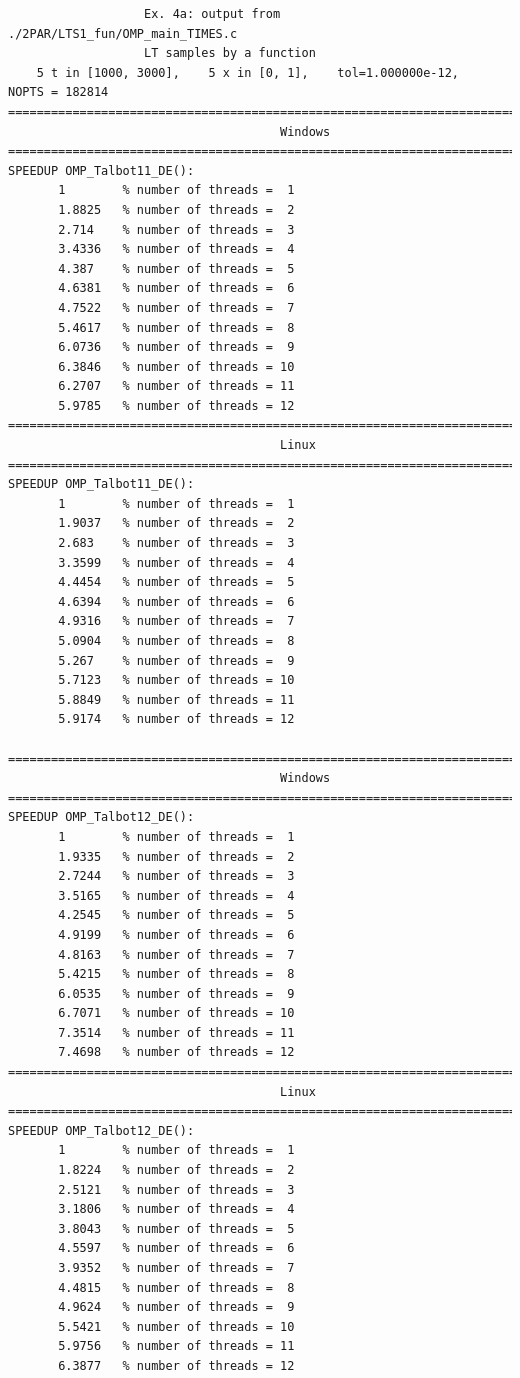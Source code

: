 \documentclass[a4paper,10pt]{report}%
\begin{document}
\begin{lstlisting}
                   Ex. 4a: output from ./2PAR/LTS1_fun/OMP_main_TIMES.c
                   LT samples by a function
    5 t in [1000, 3000],    5 x in [0, 1],    tol=1.000000e-12,    NOPTS = 182814
====================================================================================
                                      Windows
====================================================================================
SPEEDUP OMP_Talbot11_DE():
       1        % number of threads =  1
       1.8825   % number of threads =  2
       2.714    % number of threads =  3
       3.4336   % number of threads =  4
       4.387    % number of threads =  5
       4.6381   % number of threads =  6
       4.7522   % number of threads =  7
       5.4617   % number of threads =  8
       6.0736   % number of threads =  9
       6.3846   % number of threads = 10
       6.2707   % number of threads = 11
       5.9785   % number of threads = 12
====================================================================================
                                      Linux
====================================================================================
SPEEDUP OMP_Talbot11_DE():
       1        % number of threads =  1
       1.9037   % number of threads =  2
       2.683    % number of threads =  3
       3.3599   % number of threads =  4
       4.4454   % number of threads =  5
       4.6394   % number of threads =  6
       4.9316   % number of threads =  7
       5.0904   % number of threads =  8
       5.267    % number of threads =  9
       5.7123   % number of threads = 10
       5.8849   % number of threads = 11
       5.9174   % number of threads = 12

====================================================================================
                                      Windows
====================================================================================
SPEEDUP OMP_Talbot12_DE():
       1        % number of threads =  1
       1.9335   % number of threads =  2
       2.7244   % number of threads =  3
       3.5165   % number of threads =  4
       4.2545   % number of threads =  5
       4.9199   % number of threads =  6
       4.8163   % number of threads =  7
       5.4215   % number of threads =  8
       6.0535   % number of threads =  9
       6.7071   % number of threads = 10
       7.3514   % number of threads = 11
       7.4698   % number of threads = 12
====================================================================================
                                      Linux
====================================================================================
SPEEDUP OMP_Talbot12_DE():
       1        % number of threads =  1
       1.8224   % number of threads =  2
       2.5121   % number of threads =  3
       3.1806   % number of threads =  4
       3.8043   % number of threads =  5
       4.5597   % number of threads =  6
       3.9352   % number of threads =  7
       4.4815   % number of threads =  8
       4.9624   % number of threads =  9
       5.5421   % number of threads = 10
       5.9756   % number of threads = 11
       6.3877   % number of threads = 12


\end{lstlisting}
\end{document}
